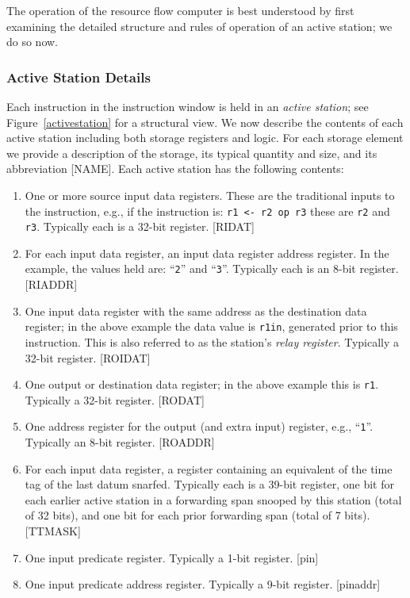 \documentclass[10pt,dvips]{article}
\begin{document}
The operation of the resource flow computer is best understood by first
examining the detailed structure and rules of operation of an active station;
we do so now.


\subsubsection{Active Station Details}
Each instruction in the instruction window is held in an {\it active
station}; see Figure~\ref{activestation} for a structural view. We now describe the
contents of each active station including both storage registers and logic. For each
storage element we provide a description of the storage, its typical quantity and
size, and its abbreviation [NAME].
Each active station has the following contents:
\begin{enumerate}
\item One or more source input data registers. These are the traditional inputs to the
instruction, e.g., if the instruction is: {\tt r1 <- r2 op r3} these are {\tt r2}
and {\tt r3}.
Typically each is a 32-bit register.
[RIDAT]
\item For each input data register, an input data register address register. In the
example, the values held are: ``{\tt 2}'' and ``{\tt 3}''.
Typically each is an 8-bit register. [RIADDR]
\item One input data register with the same address as the destination data register;
in the above example the data value is {\tt r1in}, generated prior to
this instruction. This is also referred to as the station's {\it relay register}.
Typically a 32-bit register. [ROIDAT]
\item One output or destination data register; in the above example this is {\tt r1}.
Typically a 32-bit register. [RODAT]
\item One address register for the output (and extra input) register, e.g., ``{\tt 1}''.
Typically an 8-bit register. [ROADDR]
\item For each input data register, a register containing an equivalent of the
time tag of the last datum snarfed. Typically each is a 39-bit register, one bit for
each earlier active station in a forwarding span snooped by this station
(total of 32 bits), and one bit for each prior forwarding span (total of 7 bits). [TTMASK]
\item One input predicate register. Typically a 1-bit register. [pin]
\item One input predicate address register. Typically a 9-bit register. [pinaddr]

\end{enumerate}
\end{document}
